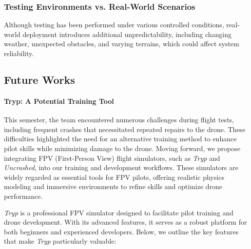 \documentclass[conference]{IEEEtran}
\begin{document}
\subsubsection{Testing Environments vs. Real-World Scenarios}
Although testing has been performed under various controlled conditions, real-world deployment introduces additional unpredictability, including changing weather, unexpected obstacles, and varying terrains, which could affect system reliability.

\subsection{Future Works}
\paragraph{Tryp: A Potential Training Tool}
This semester, the team encountered numerous challenges during flight tests, including frequent crashes that necessitated repeated repairs to the drone. These difficulties highlighted the need for an alternative training method to enhance pilot skills while minimizing damage to the drone. Moving forward, we propose integrating FPV (First-Person View) flight simulators, such as \textit{Tryp} and \textit{Uncrashed}, into our training and development workflows. These simulators are widely regarded as essential tools for FPV pilots, offering realistic physics modeling and immersive environments to refine skills and optimize drone performance.


\textit{Tryp} is a professional FPV simulator designed to facilitate pilot training and drone development. With its advanced features, it serves as a robust platform for both beginners and experienced developers. Below, we outline the key features that make \textit{Tryp} particularly valuable:
\end{document}
